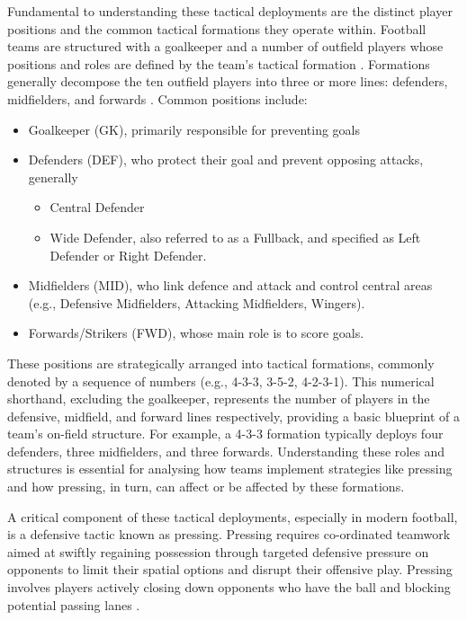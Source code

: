 Fundamental to understanding these tactical deployments are the distinct player positions and the common tactical formations they operate within. Football teams are structured with a goalkeeper and a number of outfield players whose positions and roles are defined by the team's tactical formation \citep{ma_analysis_2020, forcher_success_2023}. Formations generally decompose the ten outfield players into three or more lines: defenders, midfielders, and forwards \citep{ma_analysis_2020, forcher_success_2023}. Common positions include:
\begin{itemize}
    \item Goalkeeper (GK), primarily responsible for preventing goals
    \item Defenders (DEF), who protect their goal and prevent opposing attacks, generally 
    \begin{itemize}
        \item Central Defender 
        \item Wide Defender, also referred to as a Fullback, and specified as Left Defender or Right Defender.
    \end{itemize}
    \item Midfielders (MID), who link defence and attack and control central areas (e.g., Defensive Midfielders, Attacking Midfielders, Wingers).
    \item Forwards/Strikers (FWD), whose main role is to score goals.
\end{itemize}
These positions are strategically arranged into tactical formations, commonly denoted by a sequence of numbers (e.g., 4-3-3, 3-5-2, 4-2-3-1). This numerical shorthand, excluding the goalkeeper, represents the number of players in the defensive, midfield, and forward lines respectively, providing a basic blueprint of a team's on-field structure. For example, a 4-3-3 formation typically deploys four defenders, three midfielders, and three forwards. Understanding these roles and structures is essential for analysing how teams implement strategies like pressing and how pressing, in turn, can affect or be affected by these formations.

\citep{forcher_success_2023, low_defending_2022}

A critical component of these tactical deployments, especially in modern football, is a defensive tactic known as pressing. Pressing requires co-ordinated teamwork aimed at swiftly regaining possession through targeted defensive pressure on opponents to limit their spatial options and disrupt their offensive play. Pressing involves players actively closing down opponents who have the ball and blocking potential passing lanes \citep{borbely_all_2018}.

